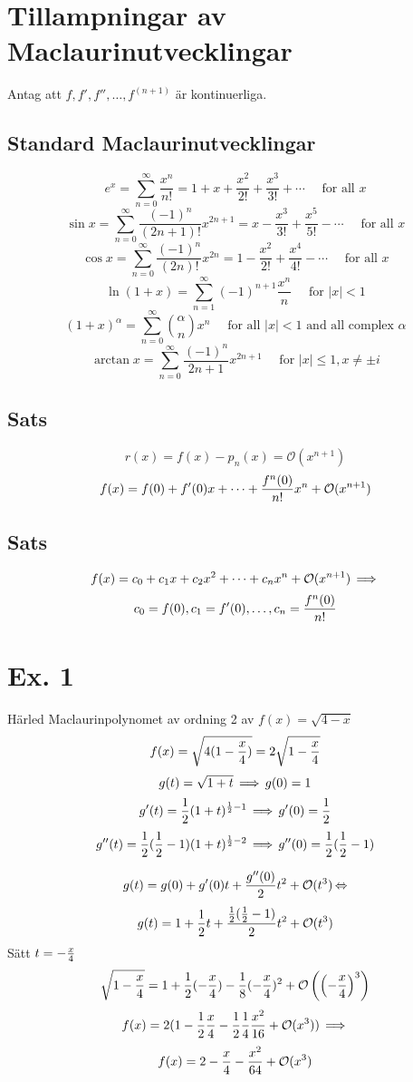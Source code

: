 \documentclass{article}
\newcommand{\Or}{{\mathcal{O}}}
\begin{document}
\section{Tillampningar av Maclaurinutvecklingar}
Antag att $f, f', f'', \dots, f^{(n+1)}$ är kontinuerliga.

\subsection{Standard Maclaurinutvecklingar}
$$ e^{x} = \sum^{\infty}_{n=0} \frac{x^n}{n!} = 1 + x + \frac{x^2}{2!} + \frac{x^3}{3!} + \cdots\quad\text{ for all } x\! $$
$$ \sin x = \sum^{\infty}_{n=0} \frac{(-1)^n}{(2n+1)!} x^{2n+1} = x - \frac{x^3}{3!} + \frac{x^5}{5!} - \cdots\quad\text{ for all } x\! $$
$$ \cos x = \sum^{\infty}_{n=0} \frac{(-1)^n}{(2n)!} x^{2n} = 1 - \frac{x^2}{2!} + \frac{x^4}{4!} - \cdots\quad\text{ for all } x\! $$
$$ \ln(1+x) = \sum^\infty_{n=1} (-1)^{n+1}\frac{x^n}n\quad\text{ for } |x| < 1 $$
$$ (1+x)^\alpha = \sum_{n=0}^\infty {\alpha \choose n} x^n\quad\text{ for all }|x| < 1 \text{ and all complex } \alpha\! $$
$$ \arctan x = \sum^{\infty}_{n=0} \frac{(-1)^n}{2n+1} x^{2n+1}\quad\text{ for }|x| \le 1, x\not=\pm i\! $$

\subsection{Sats}
$$ r(x) = f(x) - p_n(x) = \Or(x^{n+1}) $$
$$ f(x) = f(0) + f'(0)x + \dots + \f{f^n(0)}{n!}x^n + \Or(x^{n+1}) $$

\subsection{Sats}
$$ f(x) = c_0 + c_1x + c_2x^2 + \dots + c_nx^n + \Or(x^{n+1}) \im $$
$$ c_0 = f(0), c_1 = f'(0), \dots, c_n = \frac{f^n(0)}{n!} $$

\section{Ex. 1}
Härled Maclaurinpolynomet av ordning 2 av $f(x)=\sqrt{4-x}$
$$ f(x) = \sqrt{4(1- \frac{x}{4})} = 2\sqrt{1-\frac{x}{4}} $$
$$ g(t) = \sqrt{1+t} \operatorname{\implies} g(0) = 1 $$
$$ g'(t) = \frac{1}{2} (1+t)^{\frac{1}{2} - 1} \operatorname{\implies} g'(0) = \frac{1}{2} $$
$$ g''(t) = \frac{1}{2}(\frac{1}{2} - 1 )(1+t)^{\frac{1}{2} - 2 } \operatorname{\implies} g''(0) = \frac{1}{2}(\frac{1}{2} - 1) $$

$$ g(t) = g(0) + g'(0)t + \f{g''(0)}2 t^2 + \Or(t^3) \eq $$
$$ g(t) = 1 + \f 12t + \f{\f 12(\f12 -1)}2t^2 + \Or(t^3) $$
Sätt $t=-\frac{x}{4}$
$$ \sqrt{1-\f x4} = 1+\f12 (-\f x4) - \f 18(-\f x4)^2 + \Or\pa{\pa{-\f x4}^3} $$
$$ f(x) = 2(1-\f 12 \f x4 - \f 12 \f 14 \f {x^2}{16} + \Or(x^3)) \im $$
$$ f(x) = 2- \f x4 - \f{x^2}{64} + \Or(x^3) $$
\end{document}
